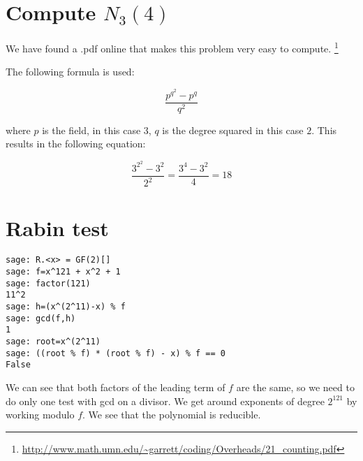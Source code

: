 \documentclass{article}
\begin{document}
\section{Compute $N_3(4)$} 

We have found a .pdf online that makes this problem very easy to compute.
\footnote{\url{http://www.math.umn.edu/~garrett/coding/Overheads/21_counting.pdf}}

The following formula is used:

\[
\frac{p^{q^2} - p^q}{q^2}
\]

where $p$ is the field, in this case $3$, $q$ is the degree squared in this case $2$.
This results in the following equation:

\[
\frac{3^{2^2} - 3^2}{2^2} = \frac{3^4 - 3^2}{4} = 18
\]

\section{Rabin test}
\begin{verbatim}
sage: R.<x> = GF(2)[]
sage: f=x^121 + x^2 + 1
sage: factor(121)
11^2
sage: h=(x^(2^11)-x) % f
sage: gcd(f,h)
1
sage: root=x^(2^11)
sage: ((root % f) * (root % f) - x) % f == 0
False
\end{verbatim}
We can see that both factors of the leading term of $f$ are the same, so we need to do only one test with gcd on a divisor.
We get around exponents of degree $2^{121}$ by working modulo $f$.
We see that the polynomial is reducible.

\end{document}

